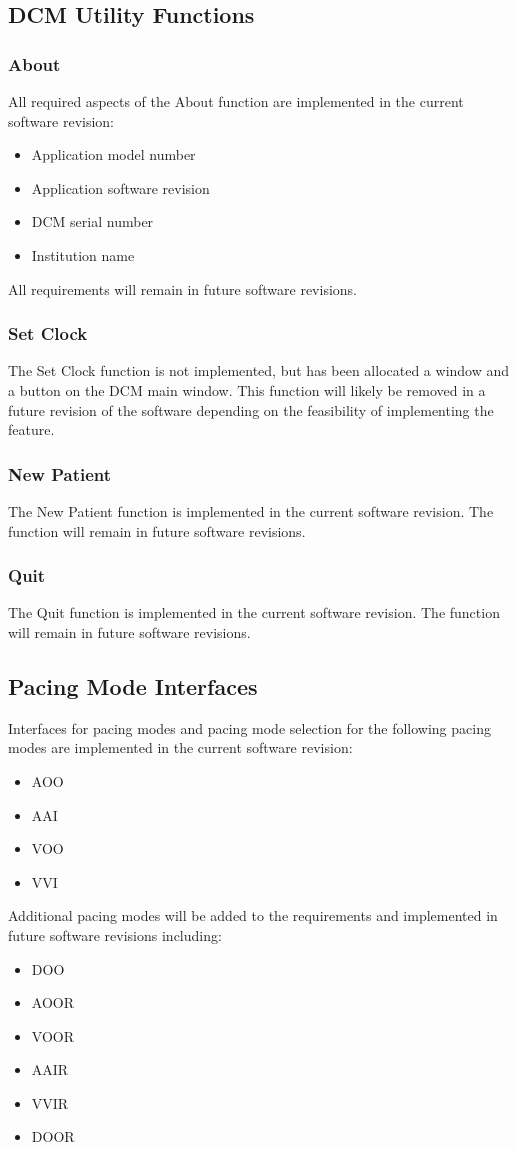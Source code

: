 \documentclass[12pt]{article}
\begin{document}
\subsection{DCM Utility Functions}
\subsubsection{About}
All required aspects of the About function are implemented in the current software revision: 
\begin{itemize}
    \item Application model number
    \item Application software revision
    \item DCM serial number
    \item Institution name
\end{itemize}
All requirements will remain in future software revisions.

\subsubsection{Set Clock}
The Set Clock function is not implemented, but has been allocated a window and a button on the DCM main window. This function will likely be removed in a future revision of the software depending on the feasibility of implementing the feature.

\subsubsection{New Patient}
The New Patient function is implemented in the current software revision. The function will remain in future software revisions.

\subsubsection{Quit}
The Quit function is implemented in the current software revision. The function will remain in future software revisions.

\subsection{Pacing Mode Interfaces}
Interfaces for pacing modes and pacing mode selection for the following pacing modes are implemented in the current software revision:
\begin{itemize}
    \item AOO
    \item AAI
    \item VOO
    \item VVI
\end{itemize} 
Additional pacing modes will be added to the requirements and implemented in future software revisions including:
\begin{itemize}
    \item DOO
    \item AOOR
    \item VOOR
    \item AAIR
    \item VVIR
    \item DOOR
\end{itemize}
\end{document}
